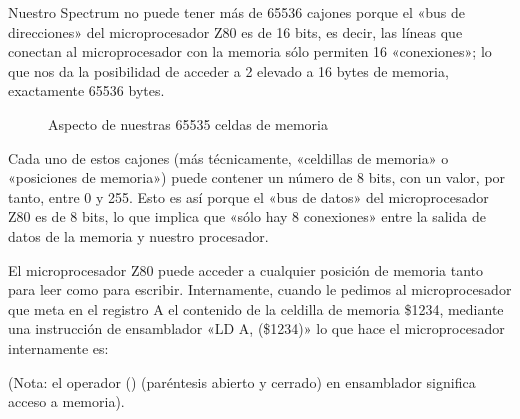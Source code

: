 \documentclass[letterpaper,10pt,spanish]{sphinxmanual}
\begin{document}
Nuestro Spectrum no puede tener más de 65536 cajones porque el «bus de direcciones» del microprocesador Z80 es de 16 bits, es decir, las líneas que conectan al microprocesador con la memoria sólo permiten 16 «conexiones»; lo que nos da la posibilidad de acceder a 2 elevado a 16 bytes de memoria, exactamente 65536 bytes.

\begin{figure}[htbp]
\centering
\capstart

\noindent{}
\caption{Aspecto de nuestras 65535 celdas de memoria}\label{\detokenize{03_arquitectura/arquitectura:id7}}\end{figure}

Cada uno de estos cajones (más técnicamente, «celdillas de memoria» o «posiciones de memoria») puede contener un número de 8 bits, con un valor, por tanto, entre 0 y 255. Esto es así porque el «bus de datos» del microprocesador Z80 es de 8 bits, lo que implica que «sólo hay 8 conexiones» entre la salida de datos de la memoria y nuestro procesador.

El microprocesador Z80 puede acceder a cualquier posición de memoria tanto para leer como para escribir. Internamente, cuando le pedimos al microprocesador que meta en el registro A el contenido de la celdilla de memoria \$1234, mediante una instrucción de ensamblador «LD A, (\$1234)» lo que hace el microprocesador internamente es:

(Nota: el operador () (paréntesis abierto y cerrado) en ensamblador significa acceso a memoria).
\end{document}
